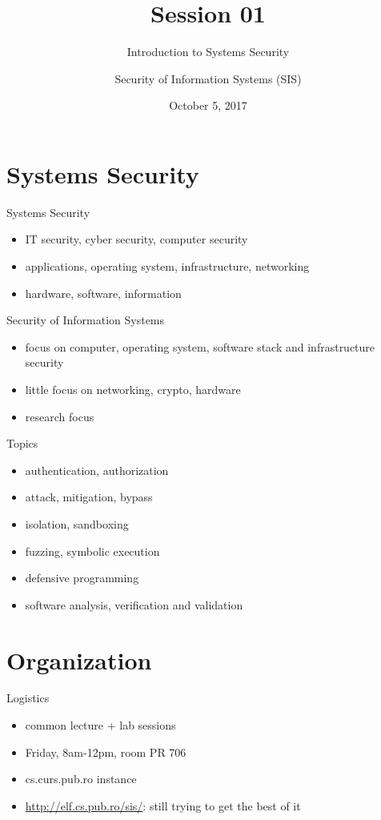 \documentclass{curs}
\title[Session 01]{Session 01}
\subtitle{Introduction to Systems Security}
\author{Security of Information Systems (SIS)}
\date{October 5, 2017}
\begin{document}
\frame{\titlepage}

\section{Systems Security}

\begin{frame}{Systems Security}
  \begin{itemize}
    \item IT security, cyber security, computer security
    \item applications, operating system, infrastructure, networking
    \item hardware, software, information
  \end{itemize}
\end{frame}

\begin{frame}{Security of Information Systems}
  \begin{itemize}
    \item focus on computer, operating system, software stack and infrastructure security
    \item little focus on networking, crypto, hardware
    \item research focus
  \end{itemize}
\end{frame}

\begin{frame}{Topics}
  \begin{itemize}
    \item authentication, authorization
    \item attack, mitigation, bypass
    \item isolation, sandboxing
    \item fuzzing, symbolic execution
    \item defensive programming
    \item software analysis, verification and validation
  \end{itemize}
\end{frame}

\section{Organization}

\begin{frame}{Logistics}
  \begin{itemize}
    \item common lecture + lab sessions
    \item Friday, 8am-12pm, room PR 706
    \item cs.curs.pub.ro instance
    \item \url{http://elf.cs.pub.ro/sis/}: still trying to get the best of it
  \end{itemize}
\end{frame}
\end{document}
